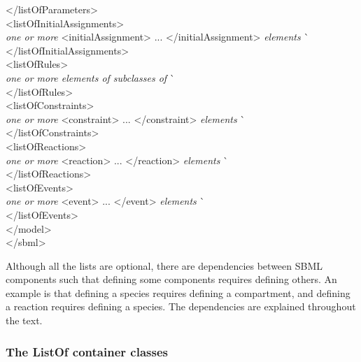 \begin{tt}
\begin{tabbing}
\>\></listOfParameters>\\
\>\><listOfInitialAssignments>\\
\>\>\>\textrm{\emph{one or more}} <initialAssignment> ... </initialAssignment> \textrm{\emph{elements}}  \` \sayOptional\\
\>\></listOfInitialAssignments>\\
\>\><listOfRules>\\
\>\>\>\textrm{\emph{one or more elements of subclasses of }}  \` \sayOptional\\
\>\></listOfRules>\\
\>\><listOfConstraints>\\
\>\>\>\textrm{\emph{one or more}} <constraint> ... </constraint> \textrm{\emph{elements}}  \` \sayOptional\\
\>\></listOfConstraints>\\
\>\><listOfReactions>\\
\>\>\>\textrm{\emph{one or more}} <reaction> ... </reaction> \textrm{\emph{elements}}  \` \sayOptional\\
\>\></listOfReactions>\\
\>\><listOfEvents>\\
\>\>\>\textrm{\emph{one or more}} <event> ... </event> \textrm{\emph{elements}}  \` \sayOptional\\
\>\></listOfEvents>\\
\></model>\\
</sbml>
\end{tabbing}
\regularspacing
\end{tt}
\vspace*{1ex}

Although all the lists are optional, there are dependencies
between SBML components such that defining some components
requires defining others.  An example is that defining a species
requires defining a compartment, and defining a reaction requires
defining a species.  The dependencies are explained throughout the
text.
  

\subsubsection{The ListOf container classes}
\label{sec:listof}
\label{sec:listofunitdefinitions}
\label{sec:listoffunctiondefinitions}
\label{sec:listofcompartmenttypes}
\label{sec:listofspeciestypes}
\label{sec:listofcompartments}
\label{sec:listofspecies}
\label{sec:listofparameters}
\label{sec:listofinitialassignments}
\label{sec:listofinitialassign}
\label{sec:listofrules}
\label{sec:listofconstraints}
\label{sec:listofreactions}
\label{sec:listofevents}

